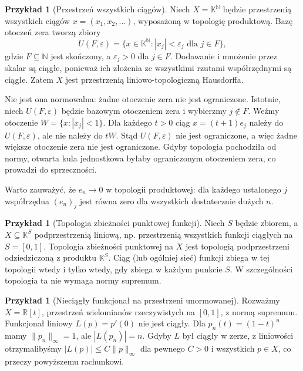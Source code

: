 \documentclass[11pt,a4paper]{article}
\numberwithin{equation}{section}
\theoremstyle{plain}
\theoremstyle{definition}
\newtheorem{przyklad}[twierdzenie]{Przykład}
\theoremstyle{remark}
\newcommand{\R}{\mathbb R}
\newcommand{\N}{\mathbb N}
\newcommand{\K}{\mathbb K}
\begin{document}
\begin{przyklad}[Przestrzeń wszystkich ciągów]\label{ex:product-tvs}
Niech $X=\K^{\N}$ będzie przestrzenią wszystkich ciągów
$x=(x_1,x_2,\ldots)$, wyposażoną w topologię produktową.
Bazę otoczeń zera tworzą zbiory
\[
 U(F,\varepsilon)=\big\{x\in\K^{\N}:|x_j|<\varepsilon_j
          \text{ dla }j\in F\big\},
\]
gdzie $F\subseteq\N$ jest skończony, a $\varepsilon_j>0$ dla
$j\in F$. Dodawanie i mnożenie przez skalar są ciągłe,
ponieważ ich złożenia ze wszystkimi rzutami współrzędnymi
są ciągłe. Zatem $X$ jest przestrzenią liniowo-topologiczną Hausdorffa.

Nie jest ona normowalna: żadne otoczenie zera nie jest ograniczone.
Istotnie, niech $U(F,\varepsilon)$ będzie bazowym otoczeniem
zera i wybierzmy $j\notin F$. Weźmy otoczenie
$W=\{x:|x_j|<1\}$. Dla każdego $t>0$ ciąg
$x=(t+1)e_j$ należy do $U(F,\varepsilon)$, ale nie należy
do $tW$. Stąd $U(F,\varepsilon)$ nie jest ograniczone,
a więc żadne większe otoczenie zera nie jest ograniczone.
Gdyby topologia pochodziła od normy, otwarta kula jednostkowa
byłaby ograniczonym otoczeniem zera, co prowadzi do sprzeczności.

Warto zauważyć, że $e_n\to0$ w topologii produktowej:
dla każdego ustalonego $j$ współrzędna $(e_n)_j$
jest równa zero dla wszystkich dostatecznie dużych $n$.
\end{przyklad}

\begin{przyklad}[Topologia zbieżności punktowej funkcji]
Niech $S$ będzie zbiorem, a $X\subseteq\K^S$ podprzestrzenią
liniową, np. przestrzenią wszystkich funkcji ciągłych na
$S=[0,1]$. Topologia zbieżności punktowej na $X$
jest topologią podprzestrzeni odziedziczoną z produktu
$\K^S$. Ciąg (lub ogólniej sieć) funkcji zbiega w tej
topologii wtedy i tylko wtedy, gdy zbiega w każdym punkcie $S$.
W szczególności topologia ta nie wymaga normy supremum.
\end{przyklad}

\begin{przyklad}[Nieciągły funkcjonał na przestrzeni unormowanej]
Rozważmy $X=\R[t]$, przestrzeń wielomianów rzeczywistych
na $[0,1]$, z normą supremum. Funkcjonał liniowy
$L(p)=p'(0)$ nie jest ciągły. Dla $p_n(t)=(1-t)^n$
mamy $\|p_n\|_\infty=1$, ale $|L(p_n)|=n$.
Gdyby $L$ był ciągły w zerze, z liniowości otrzymalibyśmy
$|L(p)|\leq C\|p\|_\infty$ dla pewnego $C>0$ i wszystkich
$p\in X$, co przeczy powyższemu rachunkowi.
\end{przyklad}
\end{document}
